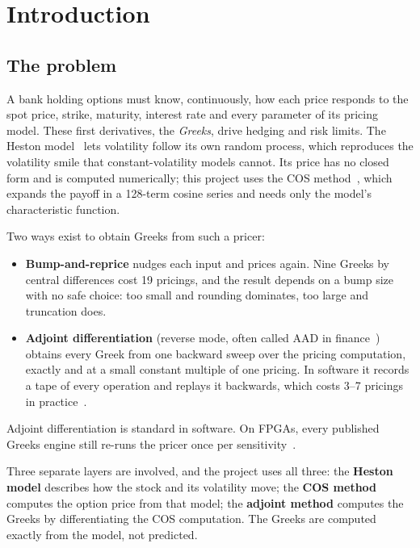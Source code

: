 \documentclass[11pt,a4paper]{article}
\begin{document}
\section{Introduction}

\subsection{The problem}
A bank holding options must know, continuously, how each price responds to the
spot price, strike, maturity, interest rate and every parameter of its pricing
model. These first derivatives, the \emph{Greeks}, drive hedging and risk limits.
The Heston model~\cite{heston} lets volatility follow its own random process, which
reproduces the volatility smile that constant-volatility models cannot. Its price has
no closed form and is computed numerically; this project uses the COS
method~\cite{fang}, which expands the payoff in a 128-term cosine series and needs
only the model's characteristic function.

Two ways exist to obtain Greeks from such a pricer:
\begin{itemize}
  \item \textbf{Bump-and-reprice} nudges each input and prices again. Nine Greeks
  by central differences cost 19 pricings, and the result depends on a bump size
  with no safe choice: too small and rounding dominates, too large and truncation
  does.
  \item \textbf{Adjoint differentiation} (reverse mode, often called AAD in
  finance~\cite{giles,capriotti}) obtains every Greek from one backward sweep over
  the pricing computation, exactly and at a small constant multiple of one pricing.
  In software it records a tape of every operation and replays it backwards, which
  costs 3--7 pricings in practice~\cite{savine}.
\end{itemize}
Adjoint differentiation is standard in software. On FPGAs, every published Greeks
engine still re-runs the pricer once per sensitivity~\cite{klai1,vitis}.

Three separate layers are involved, and the project uses all three: the
\textbf{Heston model} describes how the stock and its volatility move; the
\textbf{COS method} computes the option price from that model; the \textbf{adjoint
method} computes the Greeks by differentiating the COS computation. The Greeks are
computed exactly from the model, not predicted.
\end{document}
